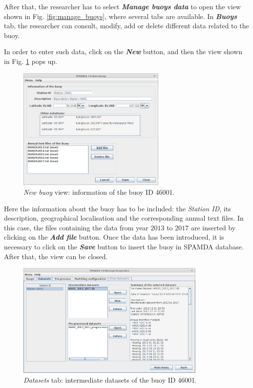 \documentclass[energies,article,submit,moreauthors,pdftex]{Definitions/mdpi}
\begin{document}
			After that, the researcher has to select \textbf{\textit{Manage buoys data}} to open the view shown in Fig. \ref{fig:manage_buoys}, where several tabs are available. In \textbf{\textit{Buoys}} tab, the researcher can consult, modify, add or delete different data related to the buoy.
			
			In order to enter such data, click on the \textbf{\textit{New}} button, and then the view shown in Fig. \ref{fig:new_buoy} pops up.

			\begin{figure}[ht!]
				\centering
				\includegraphics[width=0.65\textwidth]{figures/FigureNew_buoy.png}
				\caption{\textit{New buoy} view: information of the buoy ID 46001.}\label{fig:new_buoy}
			\end{figure}
			
			Here the information about the buoy has to be included: the \textit{Station ID}, its description, geographical localisation and the corresponding annual text files. In this case, the files containing the data from year $2013$ to $2017$ are inserted by clicking on the \textbf{\textit{Add file}} button. Once the data has been introduced, it is necessary to click on the \textbf{\textit{Save}} button to insert the buoy in SPAMDA database. After that, the view can be closed.  
		
			\begin{figure}[ht!]
				\centering
				\includegraphics[width=0.83\textwidth]{figures/FigureDatasets.png}
				\caption{\textit{Datasets} tab: intermediate datasets of the buoy ID 46001.}\label{fig:show_datasets}
			\end{figure}
			
\end{document}
